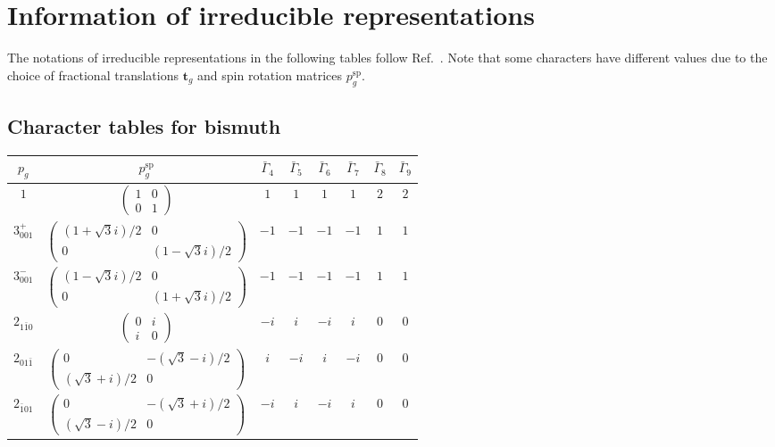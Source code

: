 \documentclass[3p,preprint]{elsarticle}
\newcommand{\bt}{\bm{t}}
\begin{document}
\section{Information of irreducible representations}\label{app:ch}
The notations of irreducible representations in the following tables follow Ref.~\cite{Bilbao}. Note that some characters have different values due to the choice of fractional translations $\bt_g$ and spin rotation matrices $p_g^{\text{sp}}$.
\subsection{Character tables for bismuth~\cite{Bilbao}}\label{app:ch-bi}
\begin{table}[H]
	\begin{tabular}{|c|c||c|c|c|c|c|c|} 
		\hline
		$p_g$ & $p_g^{\text{sp}}$ & $\bar{\Gamma}_4$ & $\bar{\Gamma}_5$ & $\bar{\Gamma}_6$ & $\bar{\Gamma}_7$ & $\bar{\Gamma}_8$ & $\bar{\Gamma}_9$  \\ \hline \hline
		$1$ & 							$\left(\begin{array}{cc} 1&0 \\ 0&1 \end{array}\right)$ & $1$ &  $1$ &  $1$ &  $1$ &  $2$ &  $2$ \\ \hline
		$3^{+}_{001}$ &				$\left(\begin{array}{cc} (1+\sqrt{3}i)/2&0 \\ 0&(1-\sqrt{3}i)/2 \end{array}\right)$ & $-1$ & $-1$ & $-1$ & $-1$ & $1$ & $1$ \\ \hline
		$3^{-}_{001}$ &				$\left(\begin{array}{cc} (1-\sqrt{3}i)/2&0 \\ 0&(1+\sqrt{3}i)/2 \end{array}\right)$ &$-1$ & $-1$ & $-1$ & $-1$ & $1$ & $1$ \\ \hline
		$2_{1\bar{1}0}$ &					$\left(\begin{array}{cc} 0&i \\ i&0 \end{array}\right)$ & $-i$ & $i$ & $-i$ & $i$ & $0$ & $0$ \\ \hline
		$2_{01\bar{1}}$ &				$\left(\begin{array}{cc} 0&-(\sqrt{3}-i)/2 \\ (\sqrt{3}+i)/2&0 \end{array}\right)$ & $i$ & $-i$ & $i$ & $-i$ & $0$ & $0$ \\ \hline
		$2_{\bar{1}01}$ &		$\left(\begin{array}{cc} 0&-(\sqrt{3}+i)/2 \\ (\sqrt{3}-i)/2&0 \end{array}\right)$ & $-i$ & $i$ & $-i$ & $i$ & $0$ & $0$ \\ \hline

\end{tabular}
\end{table}
\end{document}
